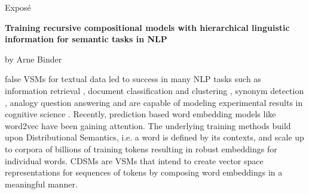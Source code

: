 
\begin{center}
	\huge{Expos\'e} 
	\vspace{0.5cm}
	 
	\large{\bf{%
	Training recursive compositional models with hierarchical linguistic information for semantic tasks in NLP
			}} 
	\vspace{0.5cm}

	by Arne Binder \\
\end{center}

\vspace{0.5cm}
\normalsize

\if false
\acfp{VSM} for textual data \autocite{salton_vector_1975} led to success in many \ac{NLP} tasks %
such as information retrieval \autocite{dierk_smart_1971,deerwester_indexing_1990}, document classification and clustering , synonym detection \autocite{rapp_word_2003}, analogy question answering \autocite{turney_similarity_2006} and are capable of modeling experimental results in cognitive science \autocite{landauer_solution_1997,mcdonald_testing_2001}.
Recently, prediction based word embedding models like word2vec \autocite{mikolov_efficient_2013} have been gaining attention. %
The underlying training methods build upon Distributional Semantics, i.e. a word is defined by its contexts, and scale up to %
corpora of billions of training tokens \autocite{mikolov_distributed_2013} resulting in robust embeddings for individual words. 
\acfp{CDSM} are \acp{VSM} that intend to create vector space representations for sequences of tokens by composing word embeddings in a meaningful manner. 
\fi

